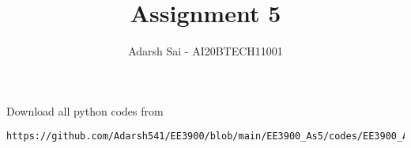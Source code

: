 \documentclass[journal,12pt,twocolumn]{IEEEtran}
\DeclareMathOperator*{\Res}{Res}
\begin{document}
\newcommand{\BEQA}{\begin{eqnarray}}
\newcommand{\EEQA}{\end{eqnarray}}
\newcommand{\define}{\stackrel{\triangle}{=}}

\raggedbottom
\setlength{\parindent}{0pt}
\providecommand{\mbf}{\mathbf}
\providecommand{\pr}[1]{\ensuremath{\Pr\left(#1\right)}}
\providecommand{\qfunc}[1]{\ensuremath{Q\left(#1\right)}}
\providecommand{\sbrak}[1]{\ensuremath{{}\left[#1\right]}}
\providecommand{\lsbrak}[1]{\ensuremath{{}\left[#1\right.}}
\providecommand{\rsbrak}[1]{\ensuremath{{}\left.#1\right]}}
\providecommand{\brak}[1]{\ensuremath{\left(#1\right)}}
\providecommand{\lbrak}[1]{\ensuremath{\left(#1\right.}}
\providecommand{\rbrak}[1]{\ensuremath{\left.#1\right)}}
\providecommand{\cbrak}[1]{\ensuremath{\left\{#1\right\}}}
\providecommand{\lcbrak}[1]{\ensuremath{\left\{#1\right.}}
\providecommand{\rcbrak}[1]{\ensuremath{\left.#1\right\}}}
\theoremstyle{remark}
\newtheorem{rem}{Remark}
\newcommand{\sgn}{\mathop{\mathrm{sgn}}}
\providecommand{\abs}[1]{\vert#1\vert}
\providecommand{\res}[1]{\Res\displaylimits_{#1}} 
\providecommand{\norm}[1]{\lVert#1\rVert}
\providecommand{\mtx}[1]{\mathbf{#1}}
\providecommand{\mean}[1]{E[ #1 ]}
\providecommand{\fourier}{\overset{\mathcal{F}}{ \rightleftharpoons}}
\providecommand{\system}{\overset{\mathcal{H}}{ \longleftrightarrow}}
\newcommand{\solution}{\noindent \textbf{Solution: }}
\newcommand{\cosec}{\,\text{cosec}\,}
\providecommand{\dec}[2]{\ensuremath{\overset{#1}{\underset{#2}{\gtrless}}}}
\newcommand{\myvec}[1]{\ensuremath{\begin{pmatrix}#1\end{pmatrix}}}
\newcommand{\mydet}[1]{\ensuremath{\begin{vmatrix}#1\end{vmatrix}}}
\makeatletter
{}
\makeatother
\let\StandardTheFigure\thefigure
\let\vec\mathbf
\renewcommand{\thefigure}{\theproblem}
\def\putbox#1#2#3{\makebox[0in][l]{\makebox[#1][l]{}\raisebox{\baselineskip}[0in][0in]{\raisebox{#2}[0in][0in]{#3}}}}
     \def\rightbox#1{\makebox[0in][r]{#1}}
     \def\centbox#1{\makebox[0in]{#1}}
     \def\topbox#1{\raisebox{-\baselineskip}[0in][0in]{#1}}
     \def\midbox#1{\raisebox{-0.5\baselineskip}[0in][0in]{#1}}
\vspace{3cm}
\title{Assignment 5}
\author{Adarsh Sai - AI20BTECH11001}
\maketitle
\newpage
\bigskip
\renewcommand{\thefigure}{\theenumi}
\renewcommand{\thetable}{\theenumi}
Download all python codes from 
\begin{lstlisting}
https://github.com/Adarsh541/EE3900/blob/main/EE3900_As5/codes/EE3900_As5.py
\end{lstlisting}
\end{document}
